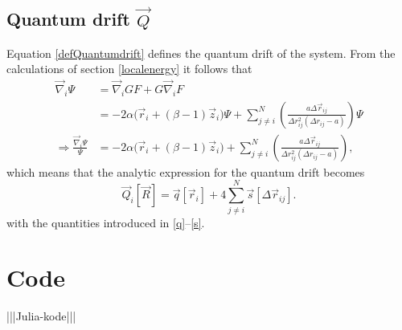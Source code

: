 \documentclass[a4paper,8pt]{article}
\begin{document}
\subsection{Quantum drift $\vec{Q}$} \label{quantumdrift}
Equation \eqref{defQuantumdrift} defines the quantum drift of the system. From the calculations of section \ref{localenergy} it follows that
\begin{align}
\vec{\nabla}_i\Psi &= \vec{\nabla}_i G F + G \vec{\nabla}_i F \nonumber\\
&= -2\alpha\Big(\vec{r}_i+(\beta-1)\vec{z}_i\Big)\Psi + \sum\limits_{j \neq i}^N \left(\frac{a\Delta\vec{r}_{ij}}{\Delta{r}_{ij}^2(\Delta{r}_{ij}-a)}\right) \Psi \nonumber\\
\Longrightarrow \frac{\vec{\nabla}_i\Psi}{\Psi} &= -2\alpha\Big(\vec{r}_i+(\beta-1)\vec{z}_i\Big) + \sum\limits_{j \neq i}^N \left(\frac{a\Delta\vec{r}_{ij}}{\Delta{r}_{ij}^2(\Delta{r}_{ij}-a)}\right),
\end{align}
which means that the analytic expression for the quantum drift becomes
\begin{equation}
\vec{Q}_i[\vec{R}] = \vec{q}[\vec{r}_i] + 4\sum\limits_{j \neq i}^N \vec{s}[\Delta\vec{r}_{ij}].
\end{equation}
with the quantities introduced in \eqref{q}–\eqref{s}.


\newpage
\section{Code}

|||Julia-kode|||
\end{document}
